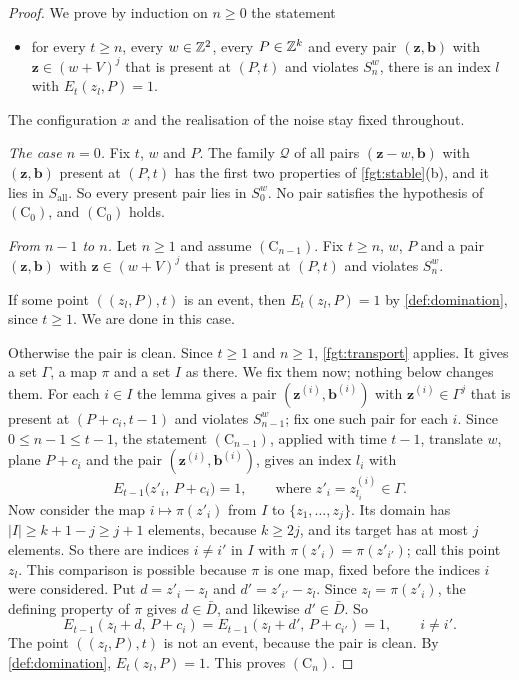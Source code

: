 \begin{proof}
We prove by induction on $n\ge0$ the statement
\begin{itemize}
\item[$(\mathrm C_n)$] for every $t\ge n$, every $w\in\mathbb{Z}^2$, every $P\in\mathbb{Z}^k$ and every pair $(\mathbf z,\mathbf b)$ with $\mathbf z\in(w+V)^j$ that is present at $(P,t)$ and violates $S^w_n$, there is an index $l$ with $E_t(z_l,P)=1$.
\end{itemize}
The configuration $x$ and the realisation of the noise stay fixed throughout.

\emph{The case $n=0$.} Fix $t$, $w$ and $P$. The family $\mathcal Q$ of all pairs $(\mathbf z-w,\mathbf b)$ with $(\mathbf z,\mathbf b)$ present at $(P,t)$ has the first two properties of \cref{fgt:stable}(b), and it lies in $S_{\mathrm{all}}$. So every present pair lies in $S^w_0$. No pair satisfies the hypothesis of $(\mathrm C_0)$, and $(\mathrm C_0)$ holds.

\emph{From $n-1$ to $n$.} Let $n\ge1$ and assume $(\mathrm C_{n-1})$. Fix $t\ge n$, $w$, $P$ and a pair $(\mathbf z,\mathbf b)$ with $\mathbf z\in(w+V)^j$ that is present at $(P,t)$ and violates $S^w_n$.

If some point $((z_l,P),t)$ is an event, then $E_t(z_l,P)=1$ by \cref{def:domination}, since $t\ge1$. We are done in this case.

Otherwise the pair is clean. Since $t\ge1$ and $n\ge1$, \cref{fgt:transport} applies. It gives a set $\Gamma$, a map $\pi$ and a set $I$ as there. We fix them now; nothing below changes them. For each $i\in I$ the lemma gives a pair $(\mathbf z^{(i)},\mathbf b^{(i)})$ with $\mathbf z^{(i)}\in\Gamma^j$ that is present at $(P+c_i,t-1)$ and violates $S^w_{n-1}$; fix one such pair for each $i$. Since $0\le n-1\le t-1$, the statement $(\mathrm C_{n-1})$, applied with time $t-1$, translate $w$, plane $P+c_i$ and the pair $(\mathbf z^{(i)},\mathbf b^{(i)})$, gives an index $l_i$ with
\[
E_{t-1}\bigl(z'_i,\,P+c_i\bigr)=1,\qquad\text{where }z'_i=z^{(i)}_{l_i}\in\Gamma.
\]
Now consider the map $i\mapsto\pi(z'_i)$ from $I$ to $\{z_1,\dots,z_j\}$. Its domain has $|I|\ge k+1-j\ge j+1$ elements, because $k\ge2j$, and its target has at most $j$ elements. So there are indices $i\ne i'$ in $I$ with $\pi(z'_i)=\pi(z'_{i'})$; call this point $z_l$. This comparison is possible because $\pi$ is one map, fixed before the indices $i$ were considered. Put $d=z'_i-z_l$ and $d'=z'_{i'}-z_l$. Since $z_l=\pi(z'_i)$, the defining property of $\pi$ gives $d\in\bar D$, and likewise $d'\in\bar D$. So
\[
E_{t-1}(z_l+d,\,P+c_i)=E_{t-1}(z_l+d',\,P+c_{i'})=1,\qquad i\ne i'.
\]
The point $((z_l,P),t)$ is not an event, because the pair is clean. By \cref{def:domination}, $E_t(z_l,P)=1$. This proves $(\mathrm C_n)$.
\end{proof}

